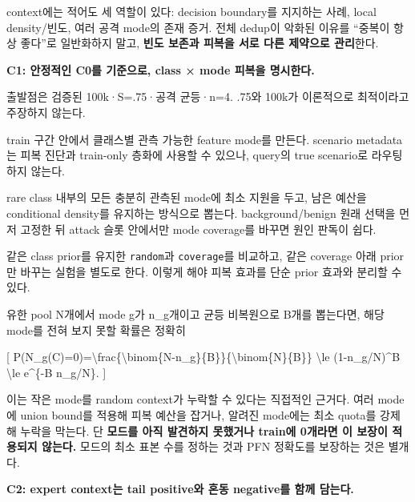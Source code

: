 context에는 적어도 세 역할이 있다: decision boundary를 지지하는 사례, local density/\allowbreak{}빈도, 여러 공격 mode의 존재 증거. 전체 dedup이 악화된 이유를 “중복이 항상 좋다”로 일반화하지 말고, \textbf{빈도 보존과 피복을 서로 다른 제약으로 관리}한다.

\textbf{C1: 안정적인 C0를 기준으로, class × mode 피복을 명시한다.}

\par\noindent \textbullet\enspace 출발점은 검증된 100k·S=\allowbreak{}.75·공격 균등·n=\allowbreak{}4. .75와 100k가 이론적으로 최적이라고 주장하지 않는다.


\par\noindent \textbullet\enspace train 구간 안에서 클래스별 관측 가능한 feature mode를 만든다. scenario metadata는 피복 진단과 train-only 층화에 사용할 수 있으나, query의 true scenario로 라우팅하지 않는다.


\par\noindent \textbullet\enspace rare class 내부의 모든 충분히 관측된 mode에 최소 지원을 두고, 남은 예산을 conditional density를 유지하는 방식으로 뽑는다. background/\allowbreak{}benign 원래 선택을 먼저 고정한 뒤 attack 슬롯 안에서만 mode coverage를 바꾸면 원인 판독이 쉽다.


\par\noindent \textbullet\enspace 같은 class prior를 유지한 \texttt{random}과 \texttt{coverage\allowbreak{}}를 비교하고, 같은 coverage 아래 prior만 바꾸는 실험을 별도로 한다. 이렇게 해야 피복 효과를 단순 prior 효과와 분리할 수 있다.


유한 pool N개에서 mode g가 n\_\allowbreak{}g개이고 균등 비복원으로 B개를 뽑는다면, 해당 mode를 전혀 보지 못할 확률은 정확히

[ P(N\_\allowbreak{}g(C)=\allowbreak{}0)=\allowbreak{}\textbackslash{}frac\{\textbackslash{}binom\{N-n\_\allowbreak{}g\}\{B\}\}\{\textbackslash{}binom\{N\}\{B\}\} \textbackslash{}le (1-n\_\allowbreak{}g/\allowbreak{}N)\textasciicircum{}B \textbackslash{}le e\textasciicircum{}\{-B n\_\allowbreak{}g/\allowbreak{}N\}. ]

이는 작은 mode를 random context가 누락할 수 있다는 직접적인 근거다. 여러 mode에 union bound를 적용해 피복 예산을 잡거나, 알려진 mode에는 최소 quota를 강제해 누락을 막는다. 단 \textbf{모드를 아직 발견하지 못했거나 train에 0개라면 이 보장이 적용되지 않는다.} 모드의 최소 표본 수를 정하는 것과 PFN 정확도를 보장하는 것은 별개다.

\textbf{C2: expert context는 tail positive와 혼동 negative를 함께 담는다.}

